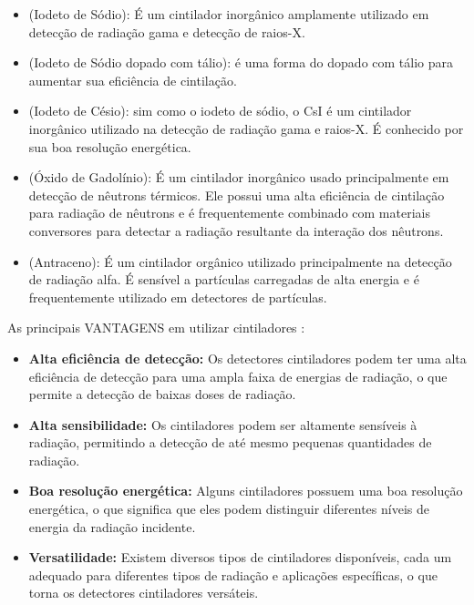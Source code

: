 \documentclass[11pt,a4paper]{article}
\begin{document}
		\begin{itemize}[label=\textcolor{CarnationPink}{$\star$}]
			\item \textbf{} (Iodeto de Sódio): É um cintilador inorgânico amplamente utilizado em detecção de radiação gama e detecção de raios-X.
			\item \textbf{} (Iodeto de Sódio dopado com tálio): é uma forma do  dopado com tálio para aumentar sua eficiência de cintilação.
			\item \textbf{} (Iodeto de Césio): sim como o iodeto de sódio, o CsI é um cintilador inorgânico utilizado na detecção de radiação gama e raios-X. É conhecido por sua boa resolução energética.
			\item \textbf{} (Óxido de Gadolínio): É um cintilador inorgânico usado principalmente em detecção de nêutrons térmicos. Ele possui uma alta eficiência de cintilação para radiação de nêutrons e é frequentemente combinado com materiais conversores para detectar a radiação resultante da interação dos nêutrons.
			\item \textbf{} (Antraceno): É um cintilador orgânico utilizado principalmente na detecção de radiação alfa. É sensível a partículas carregadas de alta energia e é frequentemente utilizado em detectores de partículas.
		\end{itemize}
	
		As principais \textcolor{CarnationPink}{VANTAGENS} em utilizar cintiladores :

		\begin{itemize}[label=\textcolor{CarnationPink}{$\blacktriangleright$}]
			\item \textbf{Alta eficiência de detecção:} Os detectores cintiladores podem ter uma alta eficiência de detecção para uma ampla faixa de energias de radiação, o que permite a detecção de baixas doses de radiação.
			\item \textbf{Alta sensibilidade:} Os cintiladores podem ser altamente sensíveis à radiação, permitindo a detecção de até mesmo pequenas quantidades de radiação.
			\item \textbf{Boa resolução energética:} Alguns cintiladores possuem uma boa resolução energética, o que significa que eles podem distinguir diferentes níveis de energia da radiação incidente.
			\item \textbf{Versatilidade:} Existem diversos tipos de cintiladores disponíveis, cada um adequado para diferentes tipos de radiação e aplicações específicas, o que torna os detectores cintiladores versáteis.
		\end{itemize}
\end{document}
